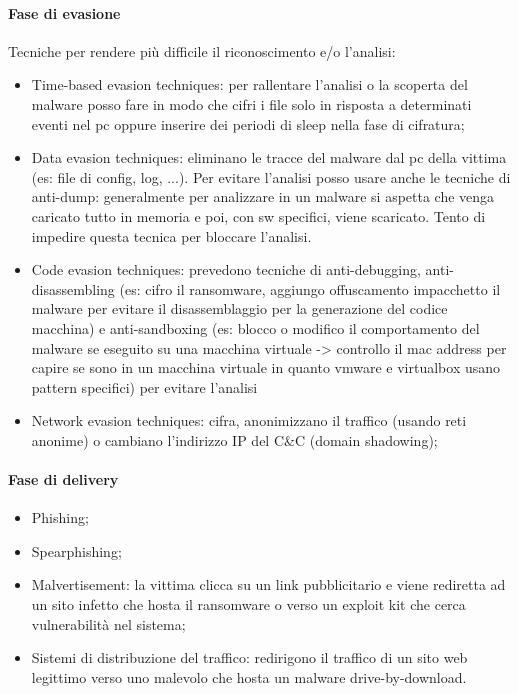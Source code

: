 \paragraph{Fase di evasione}
Tecniche per rendere più difficile il riconoscimento e/o l'analisi:
\begin{itemize}
    \item Time-based evasion techniques: per rallentare l'analisi o la scoperta del malware posso fare in modo che cifri i file solo in risposta a determinati eventi nel pc oppure inserire dei periodi di sleep nella fase di cifratura;
    \item Data evasion techniques: eliminano le tracce del malware dal pc della vittima (es: file di config, log, ...). Per evitare l'analisi posso usare anche le tecniche di anti-dump: generalmente per analizzare in un malware si aspetta che venga caricato tutto in memoria e poi, con sw specifici, viene scaricato. Tento di impedire questa tecnica per bloccare l'analisi.
    \item Code evasion techniques: prevedono tecniche di anti-debugging, anti-disassembling (es: cifro il ransomware, aggiungo offuscamento impacchetto il malware per evitare il disassemblaggio per la generazione del codice macchina) e anti-sandboxing (es: blocco o modifico il comportamento del malware se eseguito su una macchina virtuale -> controllo il mac address per capire se sono in un macchina virtuale in quanto vmware e virtualbox usano pattern specifici) per evitare l'analisi 
    \item Network evasion techniques: cifra, anonimizzano il traffico (usando reti anonime) o cambiano l'indirizzo IP del C&C (domain shadowing);
\end{itemize}

\paragraph{Fase di delivery}
\begin{itemize}
    \item Phishing;
    \item Spearphishing;
    \item Malvertisement: la vittima clicca su un link pubblicitario e viene rediretta ad un sito infetto che hosta il ransomware o verso un exploit kit che cerca vulnerabilità nel sistema;
    \item Sistemi di distribuzione del traffico: redirigono il traffico di un sito web legittimo verso uno malevolo che hosta un malware drive-by-download.
\end{itemize}

